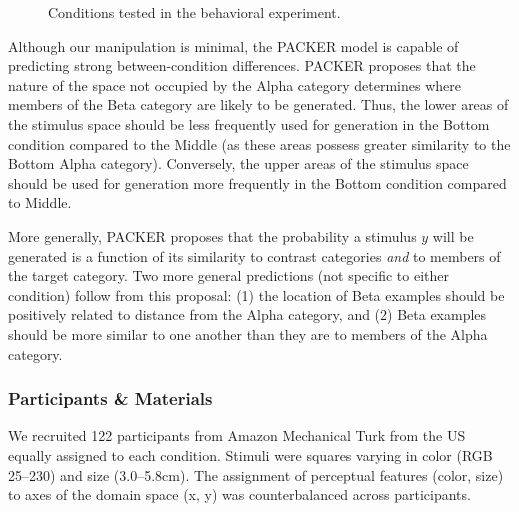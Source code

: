 \documentclass[10pt,letterpaper]{article}
\begin{document}

\begin{figure}
    \begin{center}
    
    \caption{Conditions tested in the behavioral experiment.}
    \label{fig:middle-bottom-conditions}
    \end{center}
\end{figure}

Although our manipulation is minimal, the PACKER model is capable of predicting strong between-condition differences. PACKER proposes that the nature of the space not occupied by the Alpha category determines where members of the Beta category are likely to be generated. Thus, the lower areas of the stimulus space should be less frequently used for generation in the Bottom condition compared to the Middle (as these areas possess greater similarity to the Bottom Alpha category). Conversely, the upper areas of the stimulus space should be used for generation more frequently in the Bottom condition compared to Middle.

More generally, PACKER proposes that the probability a stimulus $y$ will be generated is a function of its similarity to contrast categories \textit{and} to members of the target category. Two more general predictions (not specific to either condition) follow from this proposal: (1) the location of Beta examples should be positively related to distance from the Alpha category, and (2) Beta examples should be more similar to one another than they are to members of the Alpha category.

\subsubsection{Participants \& Materials}
We recruited 122 participants from Amazon Mechanical Turk from the US equally assigned to each condition. Stimuli were squares varying in color (RGB 25--230) and size (3.0--5.8cm). The assignment of perceptual features (color, size) to axes of the domain space (x, y) was counterbalanced across participants.
\end{document}
